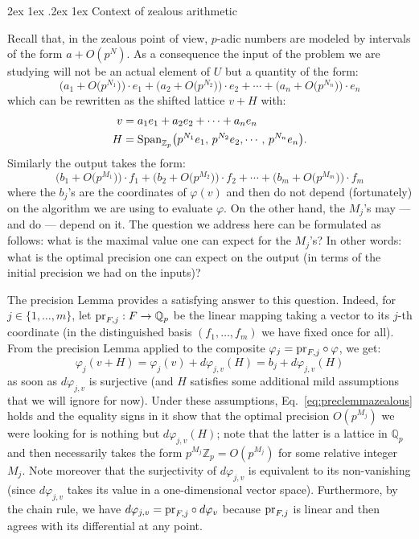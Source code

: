 \documentclass[11pt]{article}
\makeatletter
\numberwithin{equation}{section}
\numberwithin{figure}{section}
\renewcommand\paragraph{\@startsection{paragraph}{4}{\z@}%
                                    {2ex \@plus1ex \@minus.2ex}%
                                    {1ex}%
                                    {\normalfont\normalsize\bfseries}}
\theoremstyle{definition}
\newcommand{\Z}{\mathbb Z}
\newcommand{\Zp}{\Z_p}
\newcommand{\Q}{\mathbb Q}
\newcommand{\Qp}{\Q_p}
\newcommand{\Span}{\text{\rm Span}}
\newcommand{\pr}{\text{\rm pr}}
\makeatother
\begin{document}
\paragraph{Context of zealous arithmetic}

Recall that, in the zealous point of view, $p$-adic numbers are 
modeled by intervals of the form $a + O(p^N)$. As a consequence the 
input of the problem we are studying will not be an actual element of 
$U$ but a quantity of the form:
$$\big(a_1 + O\big(p^{N_1}\big) \big) \cdot e_1 + 
\big(a_2 + O\big(p^{N_2}\big) \big) \cdot e_2 + \cdots +
\big(a_n + O\big(p^{N_n}\big) \big) \cdot e_n$$
which can be rewritten as the shifted lattice $v + H$ with:
\begin{align*}
v & = a_1 e_1 + a_2 e_2 + \cdots + a_n e_n \\
H & = \Span_{\Zp} \big( p^{N_1} e_1, \, p^{N_2} e_2, \cdots, \,
p^{N_n} e_n \big).
\end{align*}
Similarly the output takes the form:
$$\big(b_1 + O\big(p^{M_1}\big) \big) \cdot f_1 + 
\big(b_2 + O\big(p^{M_2}\big) \big) \cdot f_2 + \cdots +
\big(b_m + O\big(p^{M_m}\big) \big) \cdot f_m$$
where the $b_j$'s are the coordinates of $\varphi(v)$ and then do not 
depend (fortunately) on the algorithm we are using to evaluate 
$\varphi$. On the other hand, the $M_j$'s may --- and do --- depend on
it. The question we address here can be formulated as follows: what is 
the maximal value one can expect for the $M_j$'s? In other words: what 
is the optimal precision one can expect on the output (in terms of the 
initial precision we had on the inputs)?

The precision Lemma provides a satisfying answer to this question.
Indeed, for $j \in \{1, \ldots, m\}$, let $\pr_{F,j} : F \to \Qp$ be
the linear mapping taking a vector to its $j$-th coordinate (in the
distinguished basis $(f_1, \ldots, f_m)$ we have fixed once for all). 
From the precision Lemma applied to the composite $\varphi_j = \pr_{F,j} 
\circ \varphi$, we get:
\begin{equation}
\label{eq:preclemmazealous}
\varphi_j(v+H) =
\varphi_j(v) + d\varphi_{j,v}(H) = b_j + d\varphi_{j,v}(H) 
\end{equation}
as soon as $d\varphi_{j,v}$ is surjective (and $H$ satisfies some
additional mild assumptions that we will ignore for now). 
Under these assumptions, Eq.~\eqref{eq:preclemmazealous} holds and 
the equality signs in it show that the optimal precision $O(p^{M_j})$ we 
were looking for is nothing but $d\varphi_{j,v}(H)$; note that the 
latter is a lattice in $\Qp$ and then necessarily takes the form 
$p^{M_j}\Zp = O(p^{M_j})$ for some relative integer $M_j$.
Note moreover that the surjectivity of $d\varphi_{j,v}$ is equivalent
to its non-vanishing (since $d\varphi_{j,v}$ takes its value in a
one-dimensional vector space). 
Furthermore, by the chain rule, we have $d\varphi_{j,v} = \pr_{F,j} 
\circ d\varphi_v$ because $\pr_{F,j}$ is linear and then agrees with
its differential at any point.
\end{document}
